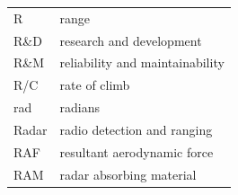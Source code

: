 \documentclass[
]{book}
\begin{document}
\begin{longtable}[]{@{}ll@{}}
\begin{minipage}[t]{0.47\columnwidth}
R\strut
\end{minipage} & \begin{minipage}[t]{0.47\columnwidth}\raggedright
range\strut
\end{minipage}\tabularnewline
\begin{minipage}[t]{0.47\columnwidth}\raggedright
R\&D\strut
\end{minipage} & \begin{minipage}[t]{0.47\columnwidth}\raggedright
research and development\strut
\end{minipage}\tabularnewline
\begin{minipage}[t]{0.47\columnwidth}\raggedright
R\&M\strut
\end{minipage} & \begin{minipage}[t]{0.47\columnwidth}\raggedright
reliability and maintainability\strut
\end{minipage}\tabularnewline
\begin{minipage}[t]{0.47\columnwidth}\raggedright
R/C\strut
\end{minipage} & \begin{minipage}[t]{0.47\columnwidth}\raggedright
rate of climb\strut
\end{minipage}\tabularnewline
\begin{minipage}[t]{0.47\columnwidth}\raggedright
rad\strut
\end{minipage} & \begin{minipage}[t]{0.47\columnwidth}\raggedright
radians\strut
\end{minipage}\tabularnewline
\begin{minipage}[t]{0.47\columnwidth}\raggedright
Radar\strut
\end{minipage} & \begin{minipage}[t]{0.47\columnwidth}\raggedright
radio detection and ranging\strut
\end{minipage}\tabularnewline
\begin{minipage}[t]{0.47\columnwidth}\raggedright
RAF\strut
\end{minipage} & \begin{minipage}[t]{0.47\columnwidth}\raggedright
resultant aerodynamic force\strut
\end{minipage}\tabularnewline
\begin{minipage}[t]{0.47\columnwidth}\raggedright
RAM\strut
\end{minipage} & \begin{minipage}[t]{0.47\columnwidth}\raggedright
radar absorbing material\strut
\end{minipage}\tabularnewline

\end{longtable}
\end{document}
